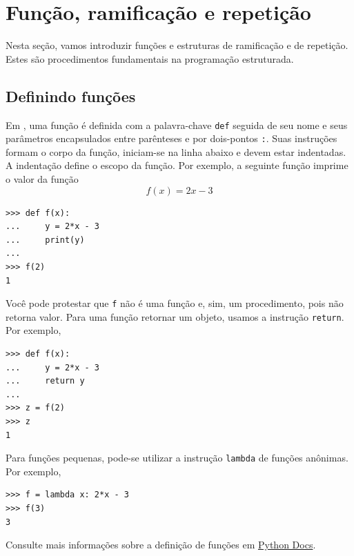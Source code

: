 \documentclass[12pt]{article}
\begin{document}
\section{Função, ramificação e repetição}\label{sec_fun}

Nesta seção, vamos introduzir funções e estruturas de ramificação e de repetição. Estes são procedimentos fundamentais na programação estruturada.

\subsection{Definindo funções}

Em {\python}, uma função é definida com a palavra-chave \lstinline+def+ seguida de seu nome e seus parâmetros encapsulados entre parênteses e por dois-pontos \lstinline+:+. Suas instruções formam o corpo da função, iniciam-se na linha abaixo e devem estar indentadas. A indentação define o escopo da função. Por exemplo, a seguinte função imprime o valor da função
\begin{equation}
  f(x) = 2x - 3
\end{equation}

\begin{lstlisting}
>>> def f(x):
...     y = 2*x - 3
...     print(y)
... 
>>> f(2)
1
\end{lstlisting}

Você pode protestar que \lstinline+f+ não é uma função e, sim, um procedimento, pois não retorna valor. Para uma função retornar um objeto, usamos a instrução \lstinline+return+. Por exemplo,

\begin{lstlisting}
>>> def f(x):
...     y = 2*x - 3
...     return y
... 
>>> z = f(2)
>>> z
1
\end{lstlisting}

\begin{obs}
  Para funções pequenas, pode-se utilizar a instrução \lstinline+lambda+ de funções anônimas. Por exemplo,

\begin{lstlisting}
>>> f = lambda x: 2*x - 3
>>> f(3)
3
\end{lstlisting}

\end{obs}

\begin{obs}
  Consulte mais informações sobre a definição de funções em \href{https://docs.python.org/3/tutorial/controlflow.html#defining-functions}{Python Docs}.
\end{obs}
\end{document}
